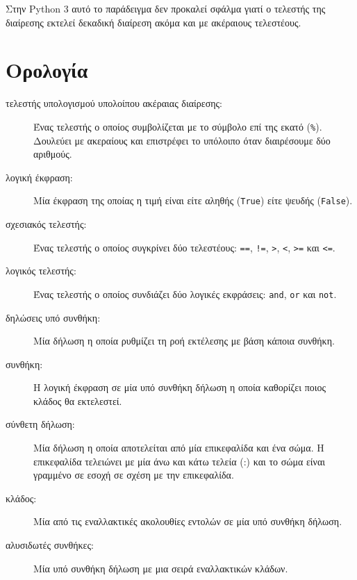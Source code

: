 \documentclass[10pt]{book}
\begin{document}
Στην Python 3 αυτό το παράδειγμα δεν προκαλεί σφάλμα γιατί ο τελεστής
της διαίρεσης εκτελεί δεκαδική διαίρεση ακόμα και με ακέραιους τελεστέους.


\section{Ορολογία}

\begin{description}

\item[τελεστής υπολογισμού υπολοίπου ακέραιας διαίρεσης:] Ένας τελεστής 
ο οποίος συμβολίζεται με το σύμβολο επί της εκατό ({\tt \%}). Δουλεύει
με ακεραίους και επιστρέφει το υπόλοιπο όταν διαιρέσουμε δύο αριθμούς.

\item[λογική έκφραση:]  Μία έκφραση της οποίας η τιμή είναι είτε αληθής  ({\tt True}) 
είτε ψευδής  ({\tt False}).

\item[σχεσιακός τελεστής:]  Ένας τελεστής ο οποίος συγκρίνει δύο τελεστέους: 
{\tt ==}, {\tt !=}, {\tt >}, {\tt <}, {\tt >=} και {\tt <=}.

\item[λογικός τελεστής:]  Ένας τελεστής ο οποίος συνδιάζει δύο λογικές εκφράσεις: 
{\tt and}, {\tt or} και {\tt not}.

\item[δηλώσεις υπό συνθήκη:]  Μία δήλωση η οποία ρυθμίζει τη ροή εκτέλεσης με βάση 
κάποια συνθήκη.

\item[συνθήκη:]  Η λογική έκφραση σε μία υπό συνθήκη δήλωση η οποία καθορίζει ποιος
κλάδος θα εκτελεστεί.

\item[σύνθετη δήλωση:]  Μία δήλωση η οποία αποτελείται από μία επικεφαλίδα και
ένα σώμα. Η επικεφαλίδα τελειώνει με μία άνω και κάτω τελεία  (:) και το σώμα
είναι γραμμένο σε εσοχή σε σχέση με την επικεφαλίδα.

\item[κλάδος:] Μία από τις εναλλακτικές ακολουθίες εντολών σε μία υπό συνθήκη
δήλωση.

\item[αλυσιδωτές συνθήκες:]  Μία υπό συνθήκη δήλωση με μια σειρά εναλλακτικών
κλάδων.


\end{description}
\end{document}
